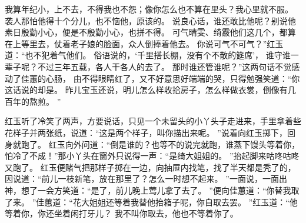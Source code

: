 我算年纪小，上不去，不得我也不怨；像你怎么也不算在里头？我心里就不服。
袭人那怕他得十个分儿，也不恼他，原该的。
说良心话，谁还敢比他呢？别说他素日殷勤小心，便是不殷勤小心，也拼不得。
可气晴雯、绮霰他们这几个，都算在上等里去，仗着老子娘的脸面，众人倒捧着他去。
你说可气不可气？”红玉道：“也不犯着气他们。
俗语说的，‘千里搭长棚，没有个不散的筵席’，
谁守谁一辈子呢？不过三年五载，各人干各人的去了。
那时谁还管谁呢？”这两句话不觉感动了佳蕙的心肠，
由不得眼睛红了，又不好意思好端端的哭，只得勉强笑道：“你这话说的却是。
昨儿宝玉还说，明儿怎么样收拾房子，怎么样做衣裳，倒像有几百年的熬煎。
”\par
红玉听了冷笑了两声，方要说话，只见一个未留头的小丫头子走进来，手里拿着些花样子并两张纸，说道：“这是两个样子，叫你描出来呢。
”说着向红玉掷下，回身就跑了。
红玉向外问道：“倒是谁的？也等不的说完就跑，谁蒸下馒头等着你，怕冷了不成！”那小丫头在窗外只说得一声：“是绮大姐姐的。
”抬起脚来咕咚咕咚又跑了。
红玉便赌气把那样子掷在一边，向抽屉内找笔，找了半天都是秃了的，因说道：“前儿一枝新笔，放在那里了？怎么一时想不起来。
”一面说，一面出神，想了一会方笑道：“是了，前儿晚上莺儿拿了去了。
”便向佳蕙道：“你替我取了来。
”佳蕙道：“花大姐姐还等着我替他抬箱子呢，你自取去罢。
”红玉道：“他等着你，你还坐着闲打牙儿？
我不叫你取去，他也不等着你了。

